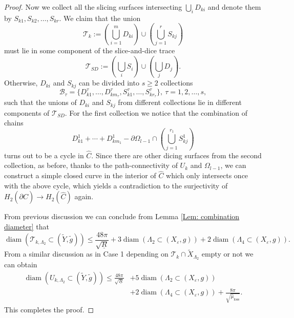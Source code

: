 \documentclass[11pt,letterpaper]{amsart}
\numberwithin{equation}{section}
\theoremstyle{definition}
\DeclareMathOperator{\diam}{diam}
\newcommand{\ve}{\varepsilon}
\begin{document}
\begin{proof}
Now we collect all the slicing surfaces intersecting ${\bigcup_i} D_{ki}$ and denote them by $S_{k1}, S_{k2},\ldots, {S_{kr}}$. We claim that the union
$$
\mathcal T_k:=\left(\bigcup_{i=1}^mD_{ki}\right)\cup\left(\bigcup_{j=1}^{r} S_{kj}\right)
$$
must lie in some component of the slice-and-dice trace
$$
\mathcal T_{SD}:=\left(\bigcup_i S_i\right)\cup\left(\bigcup_j D_j\right).
$$
Otherwise, $D_{ki}$ and $S_{kj}$ can be divided into $s\geq 2$ collections
$$
\mathcal B_\tau=\{D_{k1}^\tau,\ldots, D_{km_\tau}^\tau,S_{k1}^\tau,\ldots, S_{k{r}_\tau}^\tau\},\ \tau=1,2,\ldots,s,
$$
such that the unions of $D_{ki}$ and $S_{kj}$ from different collections lie in different components of $\mathcal T_{SD}$. For the first collection we notice that the combination of chains
$$
D_{k1}^1+\cdots+D_{km_1}^1-\partial\Omega_{l-1}\cap \left(\bigcup_{j=1}^{{r}_1}S_{kj}^1\right)
$$
turns out to be a cycle in $\hat C$. Since there are other dicing surfaces from the second collection, as before, {thanks to the path-connectivity of $U_k$ and $\Omega_{l-1}$,} we can construct a simple closed curve in the interior of $\hat C$ which only intersects once with the above cycle, which yields a contradiction to the surjectivity of $H_2(\partial \hat C)\to H_2(\hat C)$ again.

From previous discussion we can conclude from Lemma \ref{Lem: combination diameter} that
$$
\diam(\mathcal T_{k,\Lambda_2}\subset(\tilde Y,\tilde g))\leq \frac{48\pi}{\sqrt{\underline R}}+3\diam(\Lambda_2\subset(X_\ve,g))+2\diam(\Lambda_4\subset(X_\ve,g)).
$$
From a similar discussion as in Case 1 depending on $\mathcal T_k\cap\tilde X_{\Lambda_2}$ empty or not we can obtain
\[
\begin{split}
\diam(U_{k,\Lambda_2}\subset(\tilde Y,\tilde g)) \leq \frac{48\pi}{\sqrt{\underline R}} & +5\diam(\Lambda_2\subset(X_\ve,g))\\
& +2\diam(\Lambda_4\subset(X_\ve,g))+\frac{8\pi}{\sqrt{\hat \mu_{\mathrm{loss}}}}.
\end{split}
\]
This completes the proof.
\end{proof}
\end{document}
